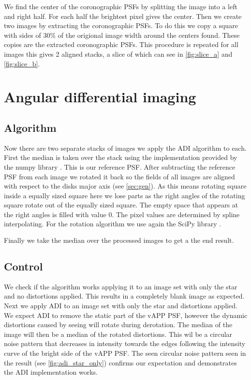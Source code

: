 We find the center of the coronographic \acp{PSF} by splitting the image into a left and right half. For each half the brightest pixel gives the center. Then we create two images by extracting the coronographic \acp{PSF}. To do this we copy a square with sides of $30\%$ of the origional image width around the centers found. These copies are the extracted coronographic \acp{PSF}. This procedure is repeated for all images this gives 2 aligned stacks, a slice of which can see in \autoref{fig:slice_a} and \autoref{fig:slice_b}.

\section{Angular differential imaging}
\subsection{Algorithm}
Now there are two separate stacks of images we apply the \ac{ADI} algorithm \cite{Marois_2006} to each. First the median is taken over the stack using the implementation provided by the numpy library \cite{numpy}. This is our reference \ac{PSF}. After subtracting the reference \ac{PSF} from each image we rotated it back so the fields of all images are aligned with respect to the disks major axis (see \autoref{sec:gen}). As this means rotating square inside a equally sized square here we lose parts as the right angles of the rotating square rotate out of the equally sized square. The empty space that appears at the right angles is filled with value $0$. The pixel values are determined by spline interpolating. For the rotation algorithm we use again the SciPy library \cite{scipy}.

Finally we take the median over the processed images to get a the end result.

\subsection{Control} %
We check if the algorithm works applying it to an image set with only the star and no distortions applied. This results in a completely blank image as expected. Next we apply \ac{ADI} to an image set with only the star and distortions applied. We expect \ac{ADI} to remove the static part of the \ac{vAPP} \ac{PSF}, however the dynamic distortions caused by seeing will rotate during derotation. The median of the image will then be a median of the rotated distortions. This wil be a circular noise pattern that decreases in intensity towards the edges following the intensity curve of the bright side of the \ac{vAPP} \ac{PSF}. The seen circular noise pattern seen in the result (see \autoref{fig:adi_star_only}) confirms our expectation and demonstrates the \ac{ADI} implementation works.


